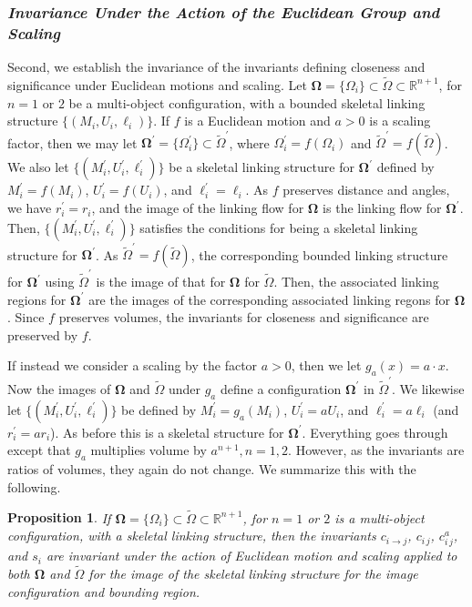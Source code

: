 \documentclass[10pt]{amsart}
\newtheorem{Proposition}[Thm]{Proposition}
\theoremstyle{definition}
\theoremstyle{definition}
\numberwithin{equation}{section}
\newcommand{\R}{{\mathbb R}}
\def \bgW {\boldsymbol \Omega}
\def \gW {\Omega}
\begin{document}
\subsubsection*{\it Invariance Under the Action of the Euclidean Group 
and 
Scaling}  \par
Second, we establish the invariance of the invariants defining closeness 
and significance under Euclidean motions and scaling.  Let $\bgW = 
\{\gW_i\} \subset \tilde \gW \subset \R^{n+1}$, for $n = 1$ or $2$ be a 
multi-object configuration, with a 
bounded skeletal linking structure $\{(M_i, U_i, \ell_i)\}$.  If $f$ is a 
Euclidean 
motion and $a > 0$ is a scaling factor, then we may let 
$\bgW^{\prime} = \{\gW_i^{\prime}\} \subset \tilde \gW^{\prime}$, where 
$\gW_i^{\prime} = f(\gW_i)$ and $\tilde \gW^{\prime} = f(\tilde \gW)$.  
We also let $\{(M_i^{\prime}, U_i^{\prime}, \ell_i^{\prime})\}$ be a 
skeletal linking structure for $\bgW^{\prime}$ defined by $M_i^{\prime} = 
f(M_i)$, $U_i^{\prime} = f(U_i)$, and $\ell_i^{\prime} = \ell_i$.  As $f$ 
preserves distance and angles, we have $r_i^{\prime} = r_i$, and the image 
of the linking flow for $\bgW$ is the linking flow for $\bgW^{\prime}$. 
Then, $\{(M_i^{\prime}, U_i^{\prime}, \ell_i^{\prime})\}$ satisfies the 
conditions for being a skeletal linking structure for $\bgW^{\prime}$.  As 
$\tilde \gW^{\prime} = f(\tilde \gW)$, the corresponding bounded linking 
structure for $\bgW^{\prime}$ using $\tilde \gW^{\prime}$ is the image of 
that for $\bgW$ for $\tilde \gW$.   Then, the associated linking regions 
for $\bgW^{\prime}$ are the images of the corresponding associated 
linking regons for $\bgW$.  Since $f$ preserves volumes, the invariants 
for closeness and significance are preserved by $f$.  \par 
If instead we consider a scaling by the factor $a > 0$, then we let $g_a(x) 
= a\cdot x$.  Now the images of $\bgW$ and $\tilde \gW$ under $g_a$ 
define a configuration $\bgW^{\prime}$ in $\tilde \gW^{\prime}$.  We 
likewise let $\{(M_i^{\prime}, U_i^{\prime}, \ell_i^{\prime})\}$ be defined 
by $M_i^{\prime} = g_a(M_i)$, $U_i^{\prime} = a U_i$, and $\ell_i^{\prime} 
= a \ell_i$ (and $r_i^{\prime} =a r_i$).  As before this is a skeletal 
structure for $\bgW^{\prime}$.  Everything goes through except that $g_a$ 
multiplies volume by $a^{n+1},n=1,2$.  However, as the invariants are 
ratios of 
volumes, they again do not change.  We summarize this with the following.
\begin{Proposition}
\label{PropII6.4}
If $\bgW = \{\gW_i\} \subset \tilde \gW \subset \R^{n+1}$, for $n = 1$ or 
$2$ is a multi-object configuration, with a skeletal linking structure, 
then the invariants $c_{i\to j}$, $c_{i\, j}$, $c^a_{i\, j}$, and $s_i$ are 
invariant under the action of Euclidean 
motion and scaling applied to both $\bgW$ and $\tilde \gW$ for the image 
of the skeletal linking structure for the image configuration and bounding 
region. 
\end{Proposition}
\end{document}
